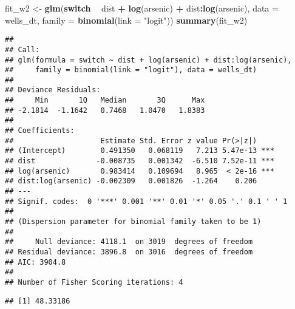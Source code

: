 \documentclass[]{article}
\newenvironment{Shaded}{\begin{snugshade}}{\end{snugshade}}
\newcommand{\KeywordTok}[1]{\textcolor[rgb]{0.13,0.29,0.53}{\textbf{#1}}}
\newcommand{\DataTypeTok}[1]{\textcolor[rgb]{0.13,0.29,0.53}{#1}}
\newcommand{\StringTok}[1]{\textcolor[rgb]{0.31,0.60,0.02}{#1}}
\newcommand{\ControlFlowTok}[1]{\textcolor[rgb]{0.13,0.29,0.53}{\textbf{#1}}}
\newcommand{\OperatorTok}[1]{\textcolor[rgb]{0.81,0.36,0.00}{\textbf{#1}}}
\newcommand{\NormalTok}[1]{#1}
\begin{document}
\begin{Shaded}
\begin{Highlighting}[]
\NormalTok{fit_w2 <-}\StringTok{ }\KeywordTok{glm}\NormalTok{(}\ControlFlowTok{switch} \OperatorTok{~}\StringTok{ }\NormalTok{dist }\OperatorTok{+}\StringTok{ }\KeywordTok{log}\NormalTok{(arsenic) }\OperatorTok{+}\StringTok{ }\NormalTok{dist}\OperatorTok{:}\KeywordTok{log}\NormalTok{(arsenic), }\DataTypeTok{data =}\NormalTok{ wells_dt, }\DataTypeTok{family =} \KeywordTok{binomial}\NormalTok{(}\DataTypeTok{link =} \StringTok{"logit"}\NormalTok{))}
\KeywordTok{summary}\NormalTok{(fit_w2)}
\end{Highlighting}
\end{Shaded}

\begin{verbatim}
## 
## Call:
## glm(formula = switch ~ dist + log(arsenic) + dist:log(arsenic), 
##     family = binomial(link = "logit"), data = wells_dt)
## 
## Deviance Residuals: 
##     Min       1Q   Median       3Q      Max  
## -2.1814  -1.1642   0.7468   1.0470   1.8383  
## 
## Coefficients:
##                    Estimate Std. Error z value Pr(>|z|)    
## (Intercept)        0.491350   0.068119   7.213 5.47e-13 ***
## dist              -0.008735   0.001342  -6.510 7.52e-11 ***
## log(arsenic)       0.983414   0.109694   8.965  < 2e-16 ***
## dist:log(arsenic) -0.002309   0.001826  -1.264    0.206    
## ---
## Signif. codes:  0 '***' 0.001 '**' 0.01 '*' 0.05 '.' 0.1 ' ' 1
## 
## (Dispersion parameter for binomial family taken to be 1)
## 
##     Null deviance: 4118.1  on 3019  degrees of freedom
## Residual deviance: 3896.8  on 3016  degrees of freedom
## AIC: 3904.8
## 
## Number of Fisher Scoring iterations: 4
\end{verbatim}

\begin{Shaded}
\end{Shaded}

\begin{verbatim}
## [1] 48.33186
\end{verbatim}

\begin{Shaded}
\end{Shaded}
\end{document}

